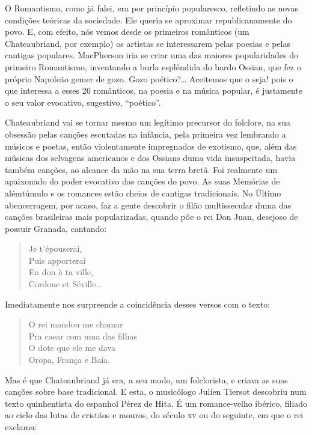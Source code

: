 O Romantismo, como já falei, era por princípio popularesco, refletindo
as novas condições teóricas da sociedade. Ele queria se aproximar
republicanamente do povo. E, com efeito, nós vemos desde os primeiros
românticos (um Chateaubriand, por exemplo) os artistas se interessarem
pelas poesias e pelas cantigas populares. MacPherson iria se criar uma
das maiores popularidades do primeiro Romantismo, inventando a burla
esplêndida do bardo Ossian, que fez o próprio Napoleão gemer de gozo.
Gozo poético?\ldots{} Aceitemos que o seja! pois o que interessa a esses 26
românticos, na poesia e na música popular, é justamente o seu valor
evocativo, sugestivo, ``poético''.

Chateaubriand vai se tornar mesmo um legítimo precursor do folclore, na
sua obsessão pelas canções escutadas na infância, pela primeira vez
lembrando a músicos e poetas, então violentamente impregnados de
exotismo, que, além das músicas dos selvagens americanos e dos Ossians
duma vida insuspeitada, havia também canções, ao alcance da mão na sua
terra bretã. Foi realmente um apaixonado do poder evocativo das canções
do povo. As suas Memórias de alémtúmulo e os romances estão cheios de
cantigas tradicionais. No Último abencerragem, por acaso, faz a gente
descobrir o filão multissecular duma das canções brasileiras mais
popularizadas, quando põe o rei Don Juan, desejoso de possuir Granada,
cantando:

\begin{verse}
Je t'épouserai,\\
Puis apporterai\\
En don à ta ville,\\
Cordoue et Séville\ldots{}
\end{verse}

Imediatamente nos surpreende a coincidência desses versos com o texto:

\begin{verse}
O rei mandou me chamar\\
Pra casar com uma das filhas\\
O dote que ele me dava\\
Oropa, França e Baía.
\end{verse}

Mas é que Chateaubriand já era, a seu modo, um folclorista, e criava as
suas canções sobre base tradicional. E esta, o musicólogo Julien Tiersot
descobriu num texto quinhentista do espanhol Pérez de Hita. É um
romance-velho ibérico, filiado ao ciclo das lutas de cristãos e mouros,
do século \textsc{xv} ou do seguinte, em que o rei exclama:

